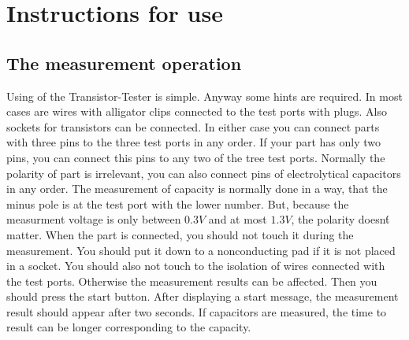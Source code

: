 \chapter{Instructions for use}
\label{sec:manual}
\section{The measurement operation}
Using of the Transistor-Tester is simple.
Anyway some hints are required.
In most cases are wires with alligator clips connected to the test ports with plugs.
Also sockets for transistors can be connected.
In either case you can connect parts with three pins to the three test ports in any order.
If your part has only two pins, you can connect this pins to any two of the tree test ports.
Normally the polarity of part is irrelevant, you can also connect pins of electrolytical capacitors in any order. 
The measurement of capacity is normally done in a way, that the minus pole is at the test port with the lower number.
But, because the measurment voltage is only between \(0.3V\) and at most \(1.3V\), the polarity doesn\'t matter.
When the part is connected, you should not touch it during the measurement. You should put it down to a nonconducting pad
if it is not placed in a socket. You should also not touch to the isolation of wires connected with the test ports.
Otherwise the measurement results can be affected.
Then you should press the start button.
After displaying a start message, the measurement result should appear after two seconds.
If capacitors are measured, the time to result can be longer corresponding to the capacity.


